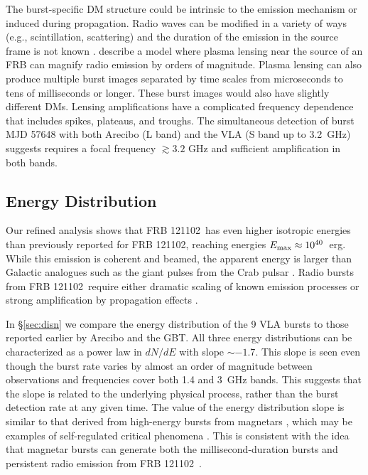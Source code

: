 \documentclass[twocolumn]{aastex61}
\newcommand{\frb}{FRB 121102}
\begin{document}
The burst-specific DM structure could be intrinsic to the emission mechanism or induced during propagation. Radio waves can be modified in a variety of ways (e.g., scintillation, scattering) and the duration of the emission in the source frame is not known \citep{2016arXiv160505890C}. \citet{2017arXiv170306580C} describe a model where plasma lensing near the source of an FRB can magnify radio emission by orders of magnitude. Plasma lensing can also produce multiple burst images separated by time scales from microseconds to tens of milliseconds or longer. These burst images would also have slightly different DMs. Lensing amplifications have a complicated frequency dependence that includes spikes, plateaus, and troughs. The simultaneous detection of burst MJD 57648 with both Arecibo (L band) and the VLA (S band up to 3.2~GHz) suggests requires a focal frequency $\gtrsim 3.2$ GHz and sufficient amplification in both bands.   

\subsection{Energy Distribution}

Our refined analysis shows that \frb\ has even higher isotropic energies than previously reported for \frb, reaching energies $E_{\rm{max}}\approx10^{40}$\ erg. While this emission is coherent and beamed, the apparent energy is larger than Galactic analogues such as the giant pulses from the Crab pulsar \citep[$\sim10^{35}$~erg, $T_{b,\rm{Crab}}\sim10^{41}$~K;][]{2003Natur.422..141H,2014PhRvD..89j3009K}. Radio bursts from \frb\ require either dramatic scaling of known emission processes \citep{2016MNRAS.462..941L, 2016MNRAS.457..232C} or strong amplification by propagation effects \citep{2017arXiv170306580C}.

In \S \ref{sec:disn} we compare the energy distribution of the 9 VLA bursts to those reported earlier by Arecibo and the GBT. All three energy distributions can be characterized as a power law in $dN/dE$ with slope $\sim-1.7$. This slope is seen even though the burst rate varies by almost an order of magnitude between observations and frequencies cover both 1.4 and 3~GHz bands. This suggests that the slope is related to the underlying physical process, rather than the burst detection rate at any given time. The value of the energy distribution slope is similar to that derived from high-energy bursts from magnetars \citep{2000ApJ...532L.121G, 2011ApJ...739...94S}, which may be examples of self-regulated critical phenomena \citep[slope$=-5/3$;][]{2011SoPh..274...99A}. This is consistent with the idea that magnetar bursts can generate both the millisecond-duration bursts and persistent radio emission from \frb\ \citep{2017arXiv170208644B}.
\end{document}
